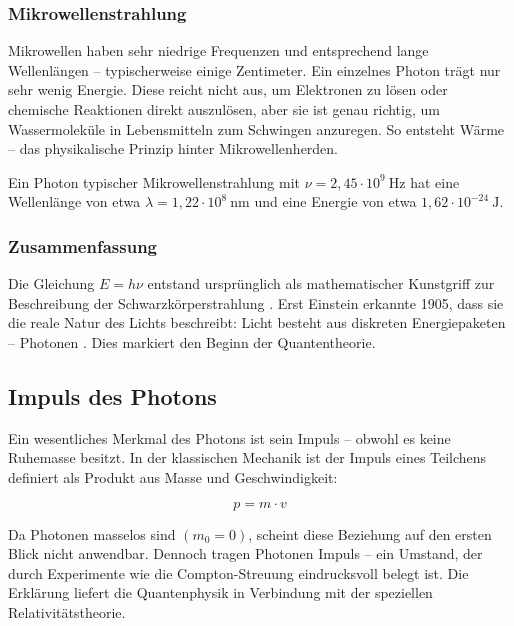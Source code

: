 \subsubsection*{Mikrowellenstrahlung}
Mikrowellen haben sehr niedrige Frequenzen und entsprechend lange Wellenlängen – typischerweise einige Zentimeter. Ein einzelnes Photon trägt nur sehr wenig Energie. Diese reicht nicht aus, um Elektronen zu lösen oder chemische Reaktionen direkt auszulösen, aber sie ist genau richtig, um Wassermoleküle in Lebensmitteln zum Schwingen anzuregen. So entsteht Wärme – das physikalische Prinzip hinter Mikrowellenherden.
\medskip
\begin{tcolorbox}[physikbox, title=Mikrowellenstrahlung]
	\label{box:Mikrowellenstrahlung}
	Ein Photon typischer Mikrowellenstrahlung mit \( \nu = 2{,}45 \cdot 10^9~\mathrm{Hz} \) hat eine Wellenlänge von etwa \( \lambda = 1{,}22\cdot 10^8~\mathrm{nm} \)
	und eine Energie von etwa \( 1{,}62 \cdot 10^{-24}~\mathrm{J} \).
\end{tcolorbox}

\subsubsection{Zusammenfassung}

\begin{tcolorbox}[mathebox,title=Photonen als Energiequanten]
	\label{box:Photon als Energiequanten}
	Die Gleichung $E = h \nu$ entstand ursprünglich als mathematischer Kunstgriff zur Beschreibung der Schwarzkörperstrahlung \cite{planck1948}. Erst Einstein erkannte 1905, dass sie die reale Natur des Lichts beschreibt: Licht besteht aus diskreten Energiepaketen – Photonen \cite{einstein1905}. Dies markiert den Beginn der Quantentheorie.
\end{tcolorbox}

\subsection{Impuls des Photons}

Ein wesentliches Merkmal des Photons ist sein Impuls – obwohl es keine Ruhemasse besitzt. In der klassischen Mechanik ist der Impuls eines Teilchens definiert als Produkt aus Masse und Geschwindigkeit:

\[
p = m \cdot v
\]

Da Photonen masselos sind \((m_0 = 0)\), scheint diese Beziehung auf den ersten Blick nicht anwendbar. Dennoch tragen Photonen Impuls – ein Umstand, der durch Experimente wie die Compton-Streuung eindrucksvoll belegt ist. Die Erklärung liefert die Quantenphysik in Verbindung mit der speziellen Relativitätstheorie.

